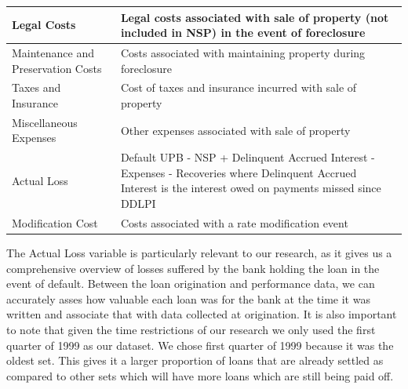 \documentclass[12 pt]{uncw_thesis}
\theoremstyle{plain}
\theoremstyle{remark}
\theoremstyle{definition}
\begin{document}
\begin{center}
\begin{longtable}{ |M{6cm}|M{8cm}| }
		\hline
		Legal Costs & Legal costs associated with sale of property (not included in NSP) in the event of foreclosure\\
		\hline
		Maintenance and Preservation Costs & Costs associated with maintaining property during foreclosure\\
		\hline
		Taxes and Insurance & Cost of taxes and insurance incurred with sale of property\\
		\hline
		Miscellaneous Expenses & Other expenses associated with sale of property \\
		\hline
		Actual Loss & Default UPB - NSP + Delinquent Accrued Interest - Expenses - Recoveries where Delinquent Accrued Interest is the interest owed on payments missed since DDLPI\\
		\hline
		Modification Cost & Costs associated with a rate modification event\\
		\hline
	\end{longtable}
\end{center}
The Actual Loss variable is particularly relevant to our research, as it gives us a comprehensive overview of losses suffered by the bank holding the loan in the event of default. Between the loan origination and performance data, we can accurately asses how valuable each loan was for the bank at the time it was written and associate that with data collected at origination. It is also important to note that given the time restrictions of our research we only used the first quarter of 1999 as our dataset. We chose first quarter of 1999 because it was the oldest set. This gives it a larger proportion of loans that are already settled as compared to other sets which will have more loans which are still being paid off.
\end{document}
